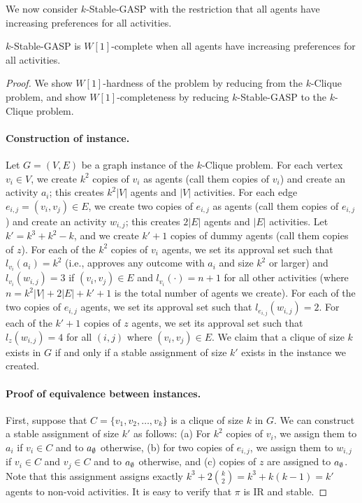 We now consider $k$-Stable-GASP with the restriction that all agents have increasing preferences for all activities. 
\begin{theorem} \label{GASP:thm:stable_w1_inc}
$k$-Stable-GASP is $W[1]$-complete when all agents have increasing preferences for all activities.
\end{theorem}
\begin{proof} 
	We show $W[1]$-hardness of the problem by reducing from the $k$-Clique problem, and show $W[1]$-completeness by reducing $k$-Stable-GASP to the $k$-Clique problem.

	\paragraph{Construction of \GASPs instance.}
	Let $G = (V, E)$ be a graph instance of the $k$-Clique problem.
	For each vertex $v_i \in V$, we create $k^2$ copies of $v_i$ as agents (call them copies of $v_i$) and create an activity $a_i$; this creates $k^2|V|$ agents and $|V|$ activities.
	For each edge $e_{i,j} = (v_i, v_j) \in E$, we create two copies of $e_{i,j}$ as agents (call them copies of $e_{i,j}$) and create an activity $w_{i,j}$; this creates $2|E|$ agents and $|E|$ activities. 
	Let $k' = k^3 + k^2 - k$, and we create $k'+1$ copies of dummy agents (call them copies of $z$).
	For each of the $k^2$ copies of $v_i$ agents, we set its approval set such that $l_{v_i}(a_i) = k^2$ (i.e., approves any outcome with $a_i$ and size $k^2$ or larger) and $l_{v_i}(w_{i,j}) = 3$ if $(v_i, v_j) \in E$ and $l_{v_i}(\cdot) = n+1$ for all other activities (where $n = k^2|V| + 2|E| + k' + 1$ is the total number of agents we create).
	For each of the two copies of $e_{i,j}$ agents, we set its approval set such that $l_{e_{i,j}}(w_{i,j}) = 2$.
	For each of the $k'+1$ copies of $z$ agents, we set its approval set such that $l_{z}(w_{i,j}) = 4$ for all $(i,j)$ where $(v_i, v_j) \in E$.
	We claim that a clique of size $k$ exists in $G$ if and only if a stable assignment of size $k'$ exists in the \GASPs instance we created. 

	\paragraph{Proof of equivalence between instances.}	
	First, suppose that $C = \{v_1, v_2, \dots, v_k\}$ is a clique of size $k$ in $G$. We can construct a stable assignment of size $k'$ as follows: (a) For $k^2$ copies of $v_i$, we assign them to $a_i$ if $v_i\in C$ and to $a_{\emptyset}$ otherwise, (b) for two copies of $e_{i,j}$, we assign them to $w_{i,j}$ if $v_i\in C$ and $v_j\in C$ and to $a_{\emptyset}$ otherwise, and (c) copies of $z$ are assigned to $a_{\emptyset}$. Note that this assignment assigns exactly $k^3 + 2\binom{k}{2} = k^3 + k(k-1) = k'$ agents to non-void activities. It is easy to verify that $\pi$ is IR and stable.
	

\end{proof}
